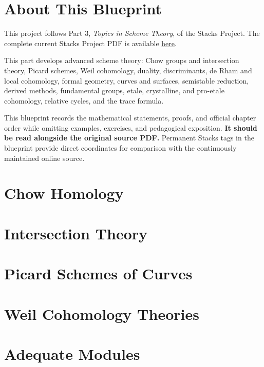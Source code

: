 

\chapter*{About This Blueprint}

This project follows Part 3, \emph{Topics in Scheme Theory}, of the Stacks
Project. The complete current Stacks Project PDF is available
\href{https://stacks.math.columbia.edu/download/book.pdf}{here}.

This part develops advanced scheme theory: Chow groups and intersection
theory, Picard schemes, Weil cohomology, duality, discriminants, de Rham and
local cohomology, formal geometry, curves and surfaces, semistable reduction,
derived methods, fundamental groups, etale, crystalline, and pro-etale
cohomology, relative cycles, and the trace formula.

This blueprint records the mathematical statements, proofs, and official
chapter order while omitting examples, exercises, and pedagogical exposition.
\textbf{It should be read alongside the original source PDF.} Permanent Stacks
tags in the blueprint provide direct coordinates for comparison with the
continuously maintained online source.

\chapter{Chow Homology}
\label{chap:chow}


\chapter{Intersection Theory}
\label{chap:intersection}


\chapter{Picard Schemes of Curves}
\label{chap:pic}


\chapter{Weil Cohomology Theories}
\label{chap:weil}


\chapter{Adequate Modules}
\label{chap:adequate}



